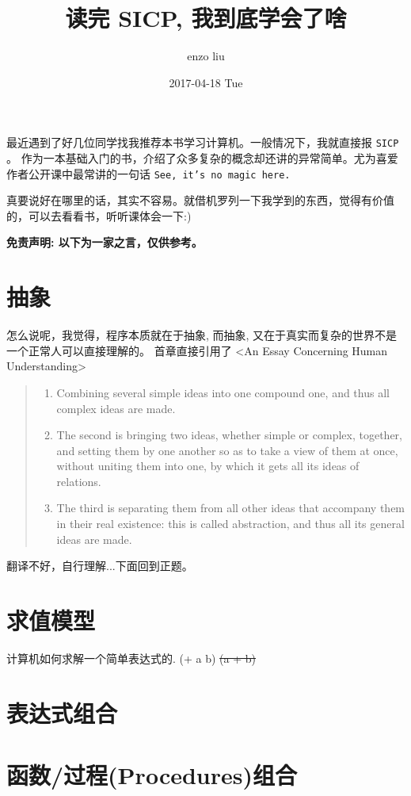 \documentclass[11pt,a4paper]{article}
\author{enzo liu}
\date{2017-04-18 Tue}
\title{读完 SICP, 我到底学会了啥}
\begin{document}
\maketitle
最近遇到了好几位同学找我推荐本书学习计算机。一般情况下，我就直接报 \texttt{SICP} 。
作为一本基础入门的书，介绍了众多复杂的概念却还讲的异常简单。尤为喜爱作者公开课中最常讲的一句话 \texttt{See, it's no magic here.}

真要说好在哪里的话，其实不容易。就借机罗列一下我学到的东西，觉得有价值的，可以去看看书，听听课体会一下:)

\textbf{免责声明: 以下为一家之言，仅供参考。}

\section*{抽象}
\label{sec:org03f49bf}
怎么说呢，我觉得，程序本质就在于抽象, 而抽象, 又在于真实而复杂的世界不是一个正常人可以直接理解的。
首章直接引用了 <An Essay Concerning Human Understanding>
\begin{quote}
\begin{enumerate}
\item Combining several simple ideas into one compound one, and thus all complex ideas are made.
\item The second is bringing two ideas, whether simple or complex, together, and setting them by one another so as to take a view of them at once, without uniting them into one, by which it gets all its ideas of relations.
\item The third is separating them from all other ideas that accompany them in their real existence: this is called abstraction, and thus all its general ideas are made.
\end{enumerate}
\end{quote}
翻译不好，自行理解...下面回到正题。

\section*{求值模型}
\label{sec:org408d565}
计算机如何求解一个简单表达式的. (+ a b) \sout{(a + b)}

\section*{表达式组合}
\label{sec:org0917cb7}

\section*{函数/过程(Procedures)组合}
\label{sec:org394bfc3}
\end{document}
